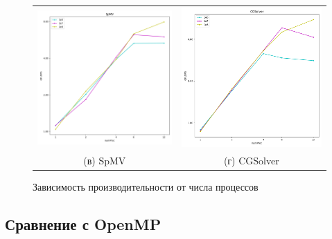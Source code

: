 \documentclass[12pt, a4paper]{article}
\begin{document}
\begin{figure}[H]
\begin{tabular}{cc}
		\includegraphics[width=85mm]{2025/mpi_spmv} & \includegraphics[width=85mm]{2025/mpi_cgsolver} \\
		(в) SpMV & (г) CGSolver \\[6pt]
	\end{tabular}
	\caption{Зависимость производительности от числа процессов}
	\label{fig:mpi_flops_polus} 
\end{figure}

\iffalse

\newpage
\subsection{Сравнение с OpenMP}
\end{document}
